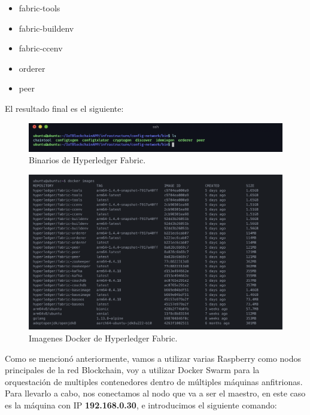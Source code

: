 \begin{itemize}
  \item fabric-tools
  \item fabric-buildenv
  \item fabric-ccenv
  \item orderer
  \item peer
\end{itemize}

\newpage

\noindent El resultado final es el siguiente:

\begin{figure}[ht!]
  \centering
  \includegraphics[width=\textwidth]{imagenes/desarrollo/binarios_fabric}
  \caption{Binarios de Hyperledger Fabric.}
  \label{fig:binarios-fabric}
\end{figure}

\begin{figure}[ht!]
  \centering
  \includegraphics[width=\textwidth]{imagenes/desarrollo/imagenes_docker}
  \caption{Imagenes Docker de Hyperledger Fabric.}
  \label{fig:imagenes-docker}
\end{figure}

\noindent Como se mencionó anteriormente, vamos a utilizar varias Raspberry como nodos principales de la red 
Blockchain, voy a utilizar Docker Swarm para la orquestación de multiples contenedores dentro de múltiples 
máquinas anfitrionas. Para llevarlo a cabo, nos conectamos al nodo que va a ser el maestro, en este caso es la
máquina con IP \textbf{192.168.0.30}, e introducimos el siguiente comando:


